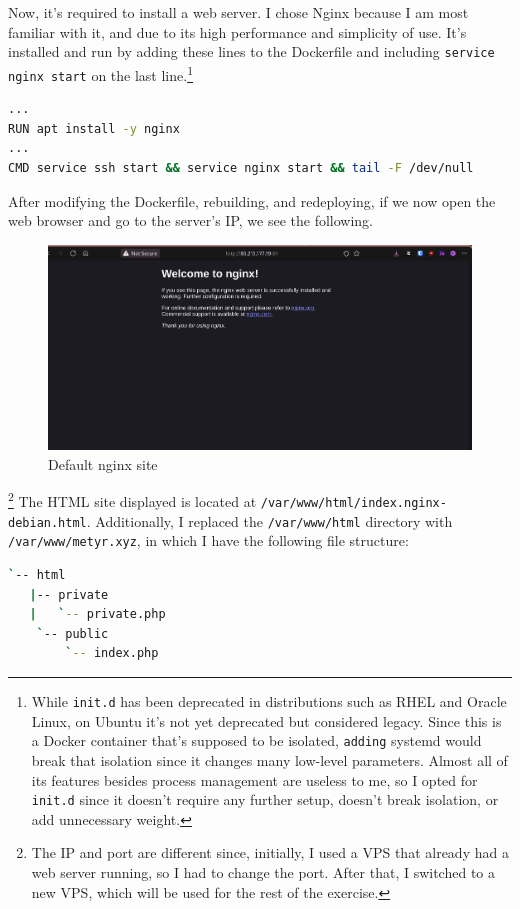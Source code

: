 \documentclass[a4paper]{article}
\newcommand{\abc}{\hfill \break}
\begin{document}
Now, it's required to install a web server. I chose Nginx because I am most familiar with it, and due to its high performance and simplicity of use.\abc
It’s installed and run by adding these lines to the Dockerfile and including \texttt{service nginx start} on the last line.\footnote{While \texttt{init.d} has been deprecated in distributions such as RHEL and Oracle Linux, on Ubuntu it's not yet deprecated but considered legacy. Since this is a Docker container that's supposed to be isolated, \texttt{adding} systemd would break that isolation since it changes many low-level parameters. Almost all of its features besides process management are useless to me, so I opted for \texttt{init.d} since it doesn't require any further setup, doesn't break isolation, or add unnecessary weight.}
\begin{lstlisting}[language=bash]
...
RUN apt install -y nginx
...
CMD service ssh start && service nginx start && tail -F /dev/null
\end{lstlisting}
After modifying the Dockerfile, rebuilding, and redeploying, if we now open the web browser and go to the server's IP, we see the following.
\begin{figure}[h]
	\includegraphics[scale=0.2]{images/nginx.png}
	\centering
	\caption{Default nginx site}
\end{figure}\footnote{The IP and port are different since, initially, I used a VPS that already had a web server running, so I had to change the port. After that, I switched to a new VPS, which will be used for the rest of the exercise.}\abc
The HTML site displayed is located at \texttt{/var/www/html/index.nginx-debian.html}.
Additionally, I replaced the \texttt{/var/www/html} directory with \texttt{/var/www/metyr.xyz}, in which I have the following file structure:
\begin{lstlisting}[language=bash]
`-- html
   |-- private
   |   `-- private.php
    `-- public
        `-- index.php
\end{lstlisting}
\end{document}
